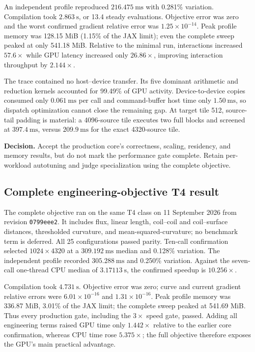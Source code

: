 \documentclass[11pt,a4paper]{article}
\newcommand{\code}[1]{\texttt{#1}}
\begin{document}
An independent profile reproduced $216.475\ \mathrm{ms}$ with 0.281\%
variation.  Compilation took $2.863\ \mathrm{s}$, or 13.4 steady evaluations.
Objective error was zero and the worst confirmed gradient relative error was
$1.25\times10^{-14}$.  Peak profile memory was 128.15 MiB (1.15\% of the JAX
limit); even the complete sweep peaked at only 541.18 MiB.  Relative to the
minimal run, interactions increased $57.6\times$ while GPU latency increased
only $26.86\times$, improving interaction throughput by $2.144\times$.

The trace contained no host--device transfer.  Its five dominant arithmetic
and reduction kernels accounted for 99.49\% of GPU activity.  Device-to-device
copies consumed only $0.061\ \mathrm{ms}$ per call and command-buffer host time
only $1.50\ \mathrm{ms}$, so dispatch optimization cannot close the remaining
gap.  At target tile 512, source-tail padding is material: a 4096-source tile
executes two full blocks and screened at $397.4\ \mathrm{ms}$, versus
$209.9\ \mathrm{ms}$ for the exact 4320-source tile.

\textbf{Decision.}  Accept the production core's correctness, scaling,
residency, and memory results, but do not mark the performance gate complete.
Retain per-workload autotuning and judge specialization using the complete
objective.

\subsection{Complete engineering-objective T4 result}

The complete objective ran on the same T4 class on 11 September 2026 from
revision \code{0799eee2}.  It includes flux, linear length, coil--coil and
coil--surface distances, thresholded curvature, and mean-squared-curvature;
no benchmark term is deferred.  All 25 configurations passed parity.  Ten-call
confirmation selected $1024\times4320$ at a $309.192\ \mathrm{ms}$ median and
0.128\% variation.  The independent profile recorded $305.288\ \mathrm{ms}$
and 0.250\% variation.  Against the seven-call one-thread CPU median of
$3.17113\ \mathrm{s}$, the confirmed speedup is $10.256\times$.

Compilation took $4.731\ \mathrm{s}$.  Objective error was zero; curve and
current gradient relative errors were $6.01\times10^{-16}$ and
$1.31\times10^{-16}$.  Peak profile memory was 336.87 MiB, 3.01\% of the JAX
limit; the complete sweep peaked at 541.69 MiB.  Thus every production gate,
including the $3\times$ speed gate, passed.  Adding all engineering terms raised
GPU time only $1.442\times$ relative to the earlier core confirmation, whereas
CPU time rose $5.375\times$; the full objective therefore exposes the GPU's
main practical advantage.
\end{document}
